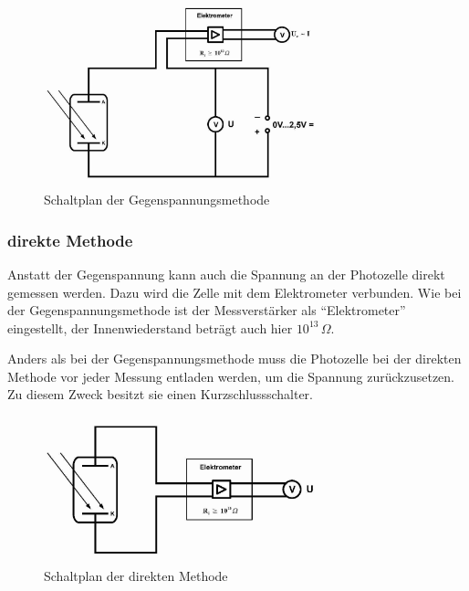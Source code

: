 \documentclass[12pt,a4paper]{scrartcl}
\numberwithin{equation}{section} %
\begin{document}
\begin{figure}[h!]
	\centering
	\includegraphics[width=0.7\textwidth]{../media/B1.4/Schaltplan_Gegenspannungsmethode.jpg}
	\caption{Schaltplan der Gegenspannungsmethode}
	\label{fig:Schaltplan Gegenspannungsmethode}
\end{figure}

\subsubsection{direkte Methode}
\label{durchführung:direkt}

Anstatt der Gegenspannung kann auch die Spannung an der Photozelle direkt gemessen werden. Dazu wird die Zelle mit dem Elektrometer verbunden. Wie bei der Gegenspannungsmethode ist der Messverstärker als ``Elektrometer'' eingestellt, der Innenwiederstand beträgt auch hier $10^{13}\,\Omega$.

Anders als bei der Gegenspannungsmethode muss die Photozelle bei der direkten Methode vor jeder Messung entladen werden, um die Spannung zurückzusetzen. Zu diesem Zweck besitzt sie einen Kurzschlussschalter.

\begin{figure}[h!]
	\centering
	\includegraphics[width=0.7\textwidth]{../media/B1.4/Schaltplan_direkte_Methode.jpg}
	\caption{Schaltplan der direkten Methode}
	\label{fig:Schaltplan direkt}
\end{figure}
\end{document}
